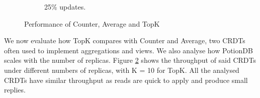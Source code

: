 \documentclass[sigconf, nonacm]{acmart}
\begin{document}
\begin{figure}
\begin{subfigure}{.34\linewidth}
	\caption{25\% updates.}
	\label{fig:crdts_25-upd}
	\end{subfigure}%
	\vspace*{-0.65em}
	\caption{Performance of Counter, Average and TopK}
	\label{fig:crdts}
	\vspace*{-0.8em}
\end{figure}

We now evaluate how TopK compares with Counter and Average, two CRDTs often used to implement aggregations and views.
We also analyse how PotionDB scales with the number of replicas.
Figure \ref{fig:crdts} shows the throughput of said CRDTs under different numbers of replicas, with K = 10 for TopK.
All the analysed CRDTs have similar throughput as reads are quick to apply and produce small replies.

\end{document}
